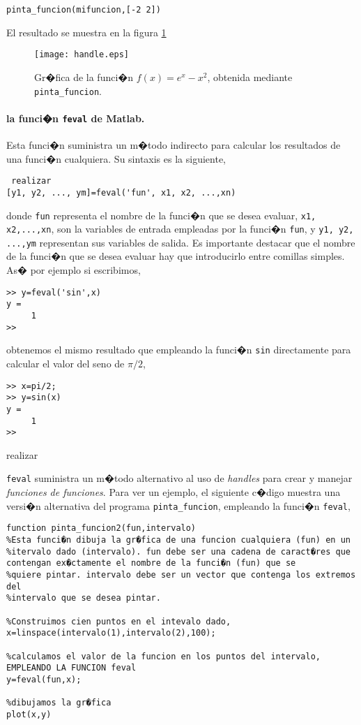 \begin{verbatim}
pinta_funcion(mifuncion,[-2 2])
\end{verbatim} 

El resultado se muestra en la figura \ref{fig:handle}

\begin{figure}[h]
\centering
\texttt{[image: handle.eps]}
\caption{Gr�fica de la funci�n $f(x)=e^x-x^2$, obtenida mediante \texttt{pinta\_funcion}.}
\label{fig:handle}
\end{figure}

\paragraph{la funci�n \texttt{feval} de Matlab.} Esta funci�n suministra un m�todo indirecto para calcular los resultados de una funci�n cualquiera.  Su sintaxis es la siguiente,
\begin{verbatim} realizar 
[y1, y2, ..., ym]=feval('fun', x1, x2, ...,xn)
\end{verbatim}

donde \texttt{fun} representa el nombre de la funci�n que se desea evaluar, \texttt{x1, x2,...,xn}, son la variables de entrada empleadas por la funci�n \texttt{fun}, y \texttt{y1, y2, ...,ym} representan sus variables de salida. Es importante destacar que el nombre de la funci�n que se desea evaluar hay que introducirlo entre comillas simples. As� por ejemplo si escribimos,

 \begin{verbatim}
>> y=feval('sin',x)
y =
     1
>> 
\end{verbatim}
obtenemos el mismo resultado que empleando la funci�n \texttt{sin} directamente para calcular  el valor del seno de $\pi/2$,
\begin{verbatim}
>> x=pi/2;
>> y=sin(x)
y =
     1
>> 
\end{verbatim}
 realizar 



\texttt{feval} suministra un m�todo alternativo al uso de \emph{handles} para crear y manejar \emph{funciones de funciones}. Para ver un ejemplo, el siguiente c�digo muestra una versi�n alternativa del programa \texttt{pinta\_funcion}, empleando la funci�n \texttt{feval},

\begin{verbatim}
function pinta_funcion2(fun,intervalo)
%Esta funci�n dibuja la gr�fica de una funcion cualquiera (fun) en un
%itervalo dado (intervalo). fun debe ser una cadena de caract�res que contengan ex�ctamente el nombre de la funci�n (fun) que se 
%quiere pintar. intervalo debe ser un vector que contenga los extremos del
%intervalo que se desea pintar.

%Construimos cien puntos en el intevalo dado,
x=linspace(intervalo(1),intervalo(2),100);

%calculamos el valor de la funcion en los puntos del intervalo, EMPLEANDO LA FUNCION feval
y=feval(fun,x);

%dibujamos la gr�fica
plot(x,y)
\end{verbatim}

